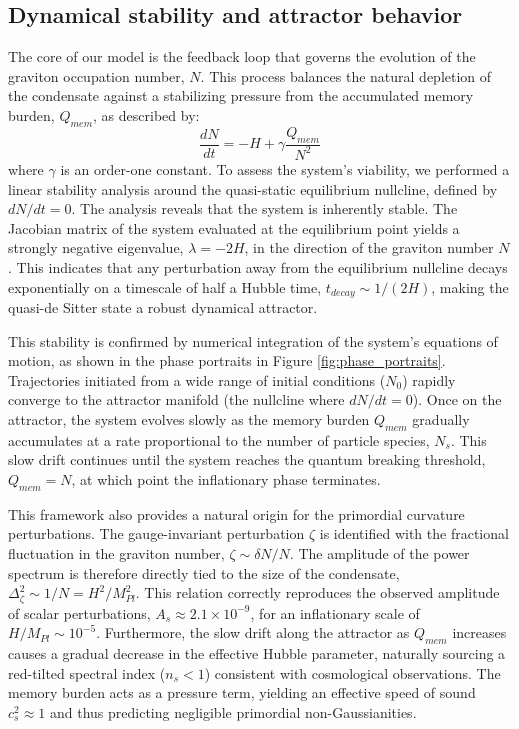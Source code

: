 \documentclass[]{article}
\begin{document}
\subsection{Dynamical stability and attractor behavior}
The core of our model is the feedback loop that governs the evolution of the graviton occupation number, $N$. This process balances the natural depletion of the condensate against a stabilizing pressure from the accumulated memory burden, $Q_{mem}$, as described by:
\begin{equation}
    \frac{dN}{dt} = -H + \gamma \frac{Q_{mem}}{N^2}
    \label{eq:dNdt}
\end{equation}
where $\gamma$ is an order-one constant. To assess the system's viability, we performed a linear stability analysis around the quasi-static equilibrium nullcline, defined by $dN/dt = 0$. The analysis reveals that the system is inherently stable. The Jacobian matrix of the system evaluated at the equilibrium point yields a strongly negative eigenvalue, $\lambda = -2H$, in the direction of the graviton number $N$. This indicates that any perturbation away from the equilibrium nullcline decays exponentially on a timescale of half a Hubble time, $t_{decay} \sim 1/(2H)$, making the quasi-de Sitter state a robust dynamical attractor.

This stability is confirmed by numerical integration of the system's equations of motion, as shown in the phase portraits in Figure \ref{fig:phase_portraits}. Trajectories initiated from a wide range of initial conditions ($N_0$) rapidly converge to the attractor manifold (the nullcline where $dN/dt=0$). Once on the attractor, the system evolves slowly as the memory burden $Q_{mem}$ gradually accumulates at a rate proportional to the number of particle species, $N_s$. This slow drift continues until the system reaches the quantum breaking threshold, $Q_{mem} = N$, at which point the inflationary phase terminates.

This framework also provides a natural origin for the primordial curvature perturbations. The gauge-invariant perturbation $\zeta$ is identified with the fractional fluctuation in the graviton number, $\zeta \sim \delta N/N$. The amplitude of the power spectrum is therefore directly tied to the size of the condensate, $\Delta_\zeta^2 \sim 1/N = H^2/M_{Pl}^2$. This relation correctly reproduces the observed amplitude of scalar perturbations, $A_s \approx 2.1 \times 10^{-9}$, for an inflationary scale of $H/M_{Pl} \sim 10^{-5}$. Furthermore, the slow drift along the attractor as $Q_{mem}$ increases causes a gradual decrease in the effective Hubble parameter, naturally sourcing a red-tilted spectral index ($n_s < 1$) consistent with cosmological observations. The memory burden acts as a pressure term, yielding an effective speed of sound $c_s^2 \approx 1$ and thus predicting negligible primordial non-Gaussianities.
\end{document}
